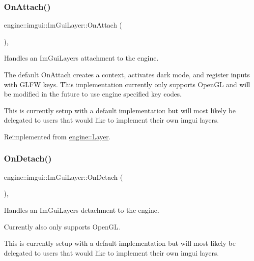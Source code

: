 \subsubsection{\texorpdfstring{On\+Attach()}{OnAttach()}}
{\footnotesize\ttfamily engine\+::imgui\+::\+Im\+Gui\+Layer\+::\+On\+Attach (\begin{DoxyParamCaption}{ }\end{DoxyParamCaption})\hspace{0.3cm}{\ttfamily [override]}, {\ttfamily [virtual]}}



Handles an Im\+Gui\+Layers attachment to the engine. 

The default On\+Attach creates a context, activates dark mode, and register inputs with G\+L\+FW keys. This implementation currently only supports Open\+GL and will be modified in the future to use engine specified key codes.

This is currently setup with a default implementation but will most likely be delegated to users that would like to implement their own imgui layers. 

Reimplemented from \hyperlink{classengine_1_1Layer}{engine\+::\+Layer}.

\mbox{\label{classengine_1_1imgui_1_1ImGuiLayer_ad443a984abe93f4101fdbadcea01bf9b}} 
\subsubsection{\texorpdfstring{On\+Detach()}{OnDetach()}}
{\footnotesize\ttfamily engine\+::imgui\+::\+Im\+Gui\+Layer\+::\+On\+Detach (\begin{DoxyParamCaption}{ }\end{DoxyParamCaption})\hspace{0.3cm}{\ttfamily [override]}, {\ttfamily [virtual]}}



Handles an Im\+Gui\+Layers detachment to the engine. 

Currently also only supports Open\+GL.

This is currently setup with a default implementation but will most likely be delegated to users that would like to implement their own imgui layers. 

